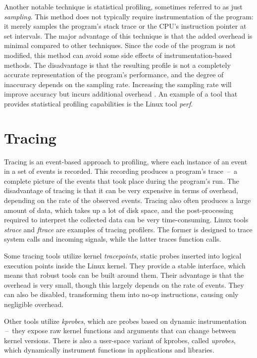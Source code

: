 Another notable technique is statistical profiling, sometimes referred to as just \emph{sampling}.
This method does not typically require instrumentation of the program: it merely samples the program's stack trace or the CPU's instruction pointer at set intervals. The major advantage of this technique is that the added overhead is minimal compared to other techniques. Since the code of the program is not modified, this method can avoid some side effects of instrumentation-based methods. The disadvantage is that the resulting profile is not a completely accurate representation of the program's performance, and the degree of inaccuracy depends on the sampling rate. Increasing the sampling rate will improve accuracy but incurs additional overhead \cite{bpf-tools}. An example of a tool that provides statistical profiling capabilities is the Linux tool \emph{perf}.

\section{Tracing}
\label{tracing}
Tracing is an event-based approach to profiling, where each instance of an event in a set of events is recorded. This recording produces a program's trace \,--\, a complete picture of the events that took place during the program's run. The disadvantage of tracing is that it can be very expensive in terms of overhead, depending on the rate of the observed events. Tracing also often produces a large amount of data, which takes up a lot of disk space, and the post-processing required to interpret the collected data can be very time-consuming. Linux tools \emph{strace} and \emph{ftrace} are examples of tracing profilers. The former is designed to trace system calls and incoming signals, while the latter traces function calls. 

Some tracing tools utilize kernel \emph{tracepoints}, static probes inserted into logical execution points inside the Linux kernel. They provide a stable interface, which means that robust tools can be built around them. Their advantage is that the overhead is very small, though this largely depends on the rate of events. They can also be disabled, transforming them into no-op instructions, causing only negligible overhead.

Other tools utilize \emph{kprobes}, which are probes based on dynamic instrumentation \,--\, they expose raw kernel functions and arguments that can change between kernel versions. There is also a user-space variant of kprobes, called \emph{uprobes}, which dynamically instrument functions in applications and libraries. \cite{gregg-systems-performance} 

